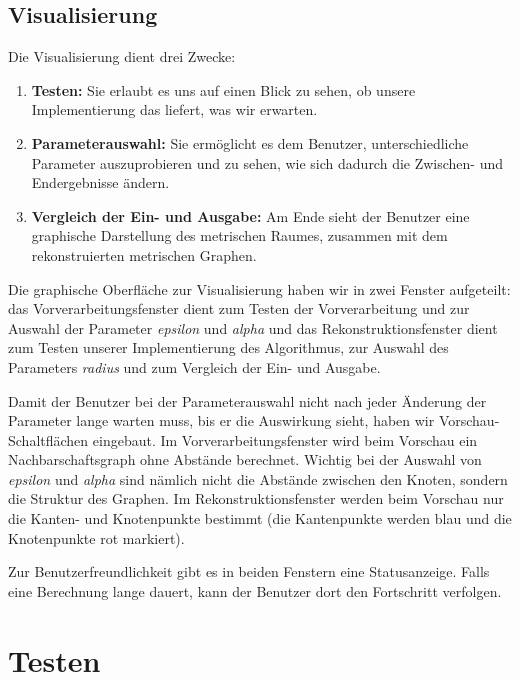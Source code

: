 \documentclass[parskip=half,
 fontsize=12pt, bibtotoc,
 ngerman]
 {article}
\begin{document}
\subsection{Visualisierung}

Die Visualisierung dient drei Zwecke:

\begin{enumerate}
\item \textbf{Testen:} Sie erlaubt es uns auf einen Blick zu sehen, ob unsere Implementierung das liefert, was wir erwarten.
\item \textbf{Parameterauswahl:} Sie ermöglicht es dem Benutzer, unterschiedliche Parameter auszuprobieren und zu sehen, wie sich dadurch die Zwischen- und Endergebnisse ändern.
\item \textbf{Vergleich der Ein- und Ausgabe:} Am Ende sieht der Benutzer eine graphische Darstellung des metrischen Raumes, zusammen mit dem rekonstruierten metrischen Graphen.
\end{enumerate}

Die graphische Oberfläche zur Visualisierung haben wir in zwei Fenster aufgeteilt: das Vorverarbeitungsfenster dient zum Testen der Vorverarbeitung und zur Auswahl der Parameter \emph{epsilon} und \emph{alpha} und das Rekonstruktionsfenster dient zum Testen unserer Implementierung des Algorithmus, zur Auswahl des Parameters \emph{radius} und zum Vergleich der Ein- und Ausgabe.

Damit der Benutzer bei der Parameterauswahl nicht nach jeder Änderung der Parameter lange warten muss, bis er die Auswirkung sieht, haben wir Vorschau-Schaltflächen eingebaut. Im Vorverarbeitungsfenster wird beim Vorschau ein Nachbarschaftsgraph ohne Abstände berechnet. Wichtig bei der Auswahl von \emph{epsilon} und \emph{alpha} sind nämlich nicht die Abstände zwischen den Knoten, sondern die Struktur des Graphen. Im Rekonstruktionsfenster werden beim Vorschau nur die Kanten- und Knotenpunkte bestimmt (die Kantenpunkte werden blau und die Knotenpunkte rot markiert).

Zur Benutzerfreundlichkeit gibt es in beiden Fenstern eine Statusanzeige. Falls eine Berechnung lange dauert, kann der Benutzer dort den Fortschritt verfolgen.

\section{Testen}
\end{document}
